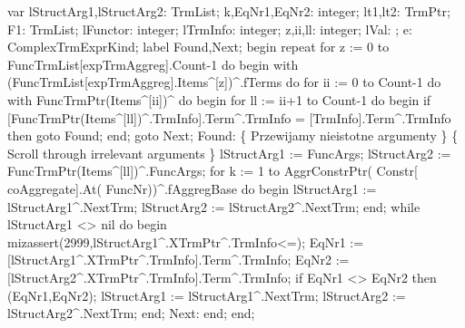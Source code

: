 var
   lStructArg1,lStructArg2: TrmList;
   k,EqNr1,EqNr2: integer;
   lt1,lt2: TrmPtr;
   F1: TrmList;
   lFunctor: integer;
   lTrmInfo: integer;
   z,ii,ll: integer;
   lVal: ;
   e: ComplexTrmExprKind;
label Found,Next;
begin
   repeat
      for z := 0 to FuncTrmList[expTrmAggreg].Count-1 do
      begin
         with (FuncTrmList[expTrmAggreg].Items^[z])^.fTerms do
            for ii := 0 to Count-1 do
               with FuncTrmPtr(Items^[ii])^ do
            begin
               for ll := ii+1 to Count-1 do
               begin
                  if [FuncTrmPtr(Items^[ll])^.TrmInfo].Term^.TrmInfo
                     = [TrmInfo].Term^.TrmInfo then goto Found;
               end;
               goto Next;
               Found:
                  \{ Przewijamy nieistotne argumenty \}
                  \{ Scroll through irrelevant arguments \}
                  lStructArg1 := FuncArgs;
               lStructArg2 := FuncTrmPtr(Items^[ll])^.FuncArgs;
               for k := 1 to AggrConstrPtr( Constr[ coAggregate].At( FuncNr))^.fAggregBase do
               begin
                  lStructArg1 := lStructArg1^.NextTrm;
                  lStructArg2 := lStructArg2^.NextTrm;
               end;
               while lStructArg1 <> nil do
               begin
                  mizassert(2999,lStructArg1^.XTrmPtr^.TrmInfo<=);
                  EqNr1 := [lStructArg1^.XTrmPtr^.TrmInfo].Term^.TrmInfo;
                  EqNr2 := [lStructArg2^.XTrmPtr^.TrmInfo].Term^.TrmInfo;
                  if EqNr1 <> EqNr2 then (EqNr1,EqNr2);
                  lStructArg1 := lStructArg1^.NextTrm; lStructArg2 := lStructArg2^.NextTrm;
               end;
               Next:
            end;
      end;
      

